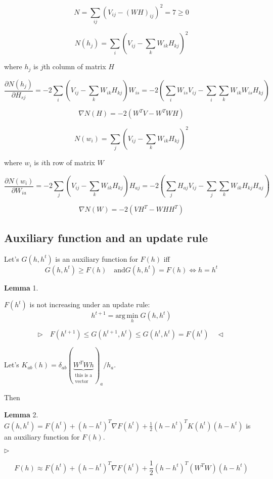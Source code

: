 \documentclass[oneside, final, 14pt]{extarticle}
\begin{document}
\[
  N = \sum_{ij}
  \left(
    V_{ij} - (WH)_{ij}
  \right)^2
  = 7 \geqslant 0
\]

\[
  N(h_j) = \sum_{i}
  \left(
    V_{ij} - \sum_{k}W_{ik}H_{kj}
  \right)^2
\]

where $h_j$ is $j$th column of matrix $H$

\[
  \frac{\partial N(h_j)}{\partial H_{sj}} =
  -2 \sum_i
    \left(
      V_{ij} - \sum_k W_{ik}H_{kj}
    \right)
  W_{is} =
  -2
    \left(
      \sum_i W_{is}V_{ij} - \sum_i\sum_kW_{ik}W_{is}H_{kj}
    \right)
\]

\[
  \nabla N(H) = -2 ( W^TV - W^TWH )
\]

\[
  N(w_i) = \sum_j \left( V_{ij} - \sum_k W_{ik}H_{kj} \right)^2
\]

where $w_i$ is $i$th row of matrix $W$

\[
  \frac{\partial N(w_i)}{\partial W_{ia}} =
  -2 \sum_j
    \left(
      V_{ij} - \sum_k W_{ik}H_{kj}
    \right)
  H_{aj} =
  -2
    \left(
      \sum_j H_{aj}V_{ij} - \sum_j \sum_k W_{ik}H_{kj}H_{aj}
    \right)
\]

\[
  \nabla N(W) = -2 ( VH^T - WHH^T )
\]

\subsection{Auxiliary function and an update rule}

Let's $G(h, h^t)$ is an auxiliary function for $F(h)$ iff
\[
  G(h,h^t) \geqslant F(h) \quad \text{and}
  G(h,h^t) = F(h) \iff h = h^t
\]

\textbf{Lemma} 1.

$F(h^t)$ is not increasing under an update rule:
\[
  h^{t+1} = \text{arg} \, \underset{h}{\text{min}} \; G(h,h^t)
\]

\[
  \rhd \quad
    F(h^{t+1}) \leqslant G(h^{t+1},h^t) \leqslant G(h^t,h^t) = F(h^t) \quad
  \lhd
\]

Let's $K_{ab}(h) =
  \delta_{ab}
  (\underbrace{W^T W h}_{\substack{\text{this is a}\\ \text{vector}}})_a
  / h_a$.

Then

\textbf{Lemma} 2.
$G(h,h^t) = F(h^t) + (h - h^t)^T \nabla F(h^t)
  + \frac{1}{2} (h - h^t)^T K(h^t) (h - h^t)$
is an auxiliary function for $F(h)$.

$\rhd$

$$F(h) \approx F(h^t) + (h - h^t)^T \nabla F(h^t)
  + \frac{1}{2} (h - h^t)^T (W^TW) (h - h^t)$$
\end{document}
